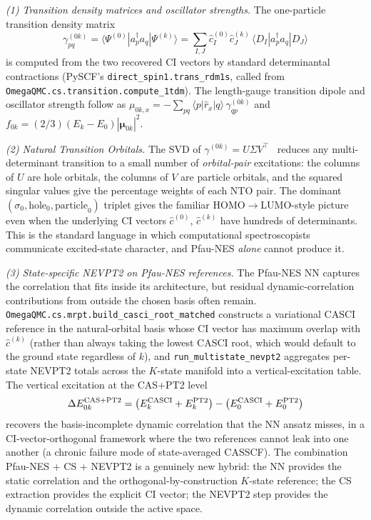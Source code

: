 \documentclass[journal=jctcce,manuscript=suppinfo,layout=traditional]{achemso}
\begin{document}
\emph{(1) Transition density matrices and oscillator strengths.}
The one-particle transition density matrix
\begin{equation}
\gamma^{(0k)}_{pq} = \langle \Psi^{(0)} | a_p^{\dagger} a_q | \Psi^{(k)} \rangle
= \sum_{I,J} \widehat{c}^{(0)}_I \widehat{c}^{(k)}_J
       \,\langle D_I | a_p^{\dagger} a_q | D_J \rangle
\end{equation}
is computed from the two recovered CI vectors by standard determinantal
contractions (PySCF's \texttt{direct\_spin1.trans\_rdm1s}, called from
\texttt{OmegaQMC.cs.transition.compute\_1tdm}). The length-gauge
transition dipole and oscillator strength follow as
$\mu_{0k,x} = -\sum_{pq} \langle p | \hat{r}_x | q \rangle\, \gamma^{(0k)}_{qp}$ and
$f_{0k} = (2/3)(E_k - E_0) |\boldsymbol{\mu}_{0k}|^2$.

\emph{(2) Natural Transition Orbitals.} The SVD of
$\gamma^{(0k)} = U \Sigma V^{\top}$~\cite{MartinNTO2003} reduces any
multi-determinant transition to a small number of \emph{orbital-pair}
excitations: the columns of $U$ are hole orbitals, the columns of $V$
are particle orbitals, and the squared singular values give the
percentage weights of each NTO pair. The dominant
$(\sigma_0, \text{hole}_0, \text{particle}_0)$ triplet gives the
familiar HOMO$\to$LUMO-style picture even when the underlying CI
vectors $\widehat{c}^{(0)}$, $\widehat{c}^{(k)}$ have hundreds of
determinants. This is the standard language in which computational
spectroscopists communicate excited-state character, and Pfau-NES
\emph{alone} cannot produce it.

\emph{(3) State-specific NEVPT2 on Pfau-NES references.} The Pfau-NES
NN captures the correlation that fits inside its architecture, but
residual dynamic-correlation contributions from outside the chosen
basis often remain. \texttt{OmegaQMC.cs.mrpt.build\_casci\_root\_matched}
constructs a variational CASCI reference in the natural-orbital basis
whose CI vector has maximum overlap with $\widehat{c}^{(k)}$ (rather
than always taking the lowest CASCI root, which would default to the
ground state regardless of $k$), and \texttt{run\_multistate\_nevpt2}
aggregates per-state NEVPT2 totals across the $K$-state manifold into
a vertical-excitation table. The vertical excitation at the CAS+PT2
level
\begin{equation}
\Delta E^{\rm CAS+PT2}_{0k}
= \bigl(E_k^{\rm CASCI} + E_k^{\rm PT2}\bigr)
- \bigl(E_0^{\rm CASCI} + E_0^{\rm PT2}\bigr)
\end{equation}
recovers the basis-incomplete dynamic correlation that the NN ansatz
misses, in a CI-vector-orthogonal framework where the two references
cannot leak into one another (a chronic failure mode of state-averaged
CASSCF). The combination Pfau-NES + CS + NEVPT2 is a genuinely new
hybrid: the NN provides the static correlation and the
orthogonal-by-construction $K$-state reference; the CS extraction
provides the explicit CI vector; the NEVPT2 step provides the dynamic
correlation outside the active space.
\end{document}
